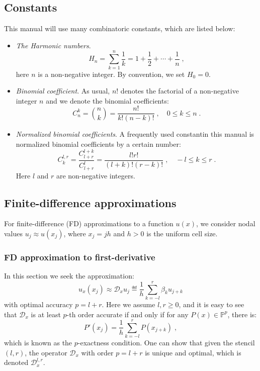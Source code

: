 \subsection{Constants}
\label{sec:bg_cnst}
This manual will use many combinatoric constants, which are listed below:
\begin{itemize}
  \item {\it The Harmonic numbers}.
    \begin{equation}\label{eq:bg_cnst_harm}
      H_n = \sum_{k=1}^n\frac{1}{k} = 1 + \frac{1}{2} + \cdots + \frac{1}{n}\;,
    \end{equation}
    here $n$ is a non-negative integer.
    By convention, we set $H_0=0$.
  \item {\it Binomial coefficient}.
    As usual, $n!$ denotes the factorial of a non-negative integer $n$ and we denote the binomial coefficients:
    \begin{equation}\label{eq:bg_cnst_binom}
      C_n^k = \binom{n}{k} = \frac{n!}{k!(n-k)!}\;,\quad 0\le k\le n\;.
    \end{equation}
  \item {\it Normalized binomial coefficients}.
    A frequently used constantin this manual is normalized binomial coefficients by a certain number:
    \begin{equation}\label{eq:bg_cnst_brat}
      C^{l,r}_k = \frac{C_{l+r}^{l+k}}{C_{l+r}^l} = \frac{l!r!}{(l+k)!(r-k)!}\;,\quad -l\le k\le r\;.
    \end{equation}
    Here $l$ and $r$ are non-negative integers.
    
\end{itemize}


\subsection{Finite-difference approximations}
\label{sec:bg_fd}
For finite-difference (FD) approximations to a function $u(x)$, we consider nodal values $u_j\approx u(x_j)$, where $x_j=jh$ and $h>0$ is the uniform cell size.

\subsubsection{FD approximation to first-derivative}
\label{sec:bg_fd_dx}
In this section we seek the approximation:
\begin{equation}\label{eq:bg_fd_dx}
  u_x(x_j) \approx \mathcal{D}_xu_j\eqdef \frac{1}{h}\sum_{k=-l}^r\beta_ku_{j+k}
\end{equation}
with optimal accuracy $p=l+r$.
Here we assume $l,r\ge0$, and it is easy to see that $\mathcal{D}_x$ is at least $p$-th order accurate if and only if for any $P(x)\in\mathbb{P}^p$, there is:
\begin{equation}\label{eq:bg_fd_dx_pexact}
  P'(x_j) = \frac{1}{h}\sum_{k=-l}^rP(x_{j+k})\;,
\end{equation}
which is known as the $p$-exactness condition.
One can show that given the stencil $(l,r)$, the operator $\mathcal{D}_x$ with order $p=l+r$ is unique and optimal, which is denoted $\mathcal{D}_x^{l,r}$.

